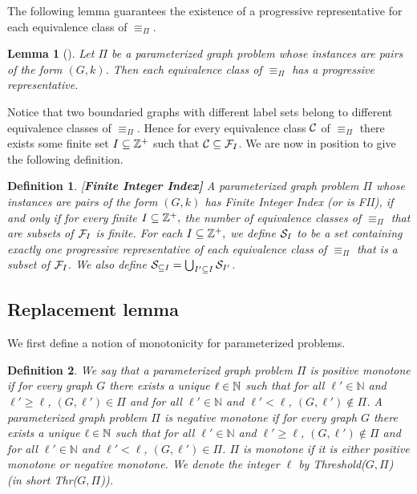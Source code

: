 \documentclass[11pt]{article}
\newtheorem{lemma}{Lemma}
\newtheorem{definition}{Definition}
\newcommand{\mar}[1]{#1}
\newcommand{\term}[1]{#1}
\begin{document}
The following lemma guarantees the existence of a progressive representative for each equivalence class of 
$\equiv_{\Pi}$. 



\begin{lemma}[\cite{H.Bodlaender:2009ng}]
\label{lem:existprog}
Let $\Pi$ be a parameterized graph problem whose instances are pairs of the form $(G,k)$.
Then each  equivalence class of $\equiv_{\Pi}$ has a progressive representative.
\end{lemma}




Notice that two  boundaried graphs with different label sets belong to 
different equivalence classes of $\equiv_{\Pi}.$ Hence for every equivalence 
class ${\cal C}$ of $\equiv_{\Pi}$ there exists some finite set $I\subseteq\Bbb{Z}^{+}$ such that 
${\cal C}\subseteq  {\cal F}_{I}$. We are now in position  to give the following definition.

\begin{definition}{\rm [\bf Finite Integer Index]}
\label{def:deffii}
A parameterized graph problem $\Pi$ whose instances are pairs of the form $(G,k)$
has {\em Finite Integer Index} (or  is \term{{\em FII}}), if and only if for every finite $I\subseteq \Bbb{Z}^+,$
the number of equivalence classes of  $\equiv_{\Pi}$ that are subsets of ${\cal F}_{I}$
is finite. For each $I\subseteq \Bbb{Z}^{+},$ we define $\mar{{\cal S}_I}$ to be
a set containing exactly one progressive representative of each equivalence class of $\equiv_{\Pi}$
that is a subset of ${\cal F}_{ I}$. We also define $\mar{{\cal S}_{\subseteq I}}=\bigcup_{I'\subseteq I} \mar{{\cal S}_{I'}} $. 
\end{definition} 


\subsection{Replacement lemma}




We first define a notion of monotonicity for parameterized problems. 

\begin{definition}
We say that a parameterized graph problem $\Pi$ is {\em positive monotone} if for every graph $G$ 
there exists a unique $\ell \in \Bbb{N}$ such that for all $\ell'\in \mathbb{N}$ and $\ell' \geq \ell$, $(G,\ell')\in \Pi$ and for all 
$\ell'\in \mathbb{N}$ and $\ell' < \ell$, $(G,\ell')\notin \Pi$.  A parameterized graph problem $\Pi$ is {\em negative monotone} if for every graph $G$ 
there exists a unique $\ell \in \Bbb{N}$ such that for all $\ell'\in \mathbb{N}$ and $\ell' \geq \ell$, $(G,\ell')\notin \Pi$ and for all 
$\ell'\in \mathbb{N}$ and $\ell' < \ell$, $(G,\ell')\in \Pi$. $\Pi$ is monotone if it is either positive monotone or negative monotone.  
We denote the integer $\ell$ by {\sc Threshold($G,\Pi$)} (in short  {\sc Thr($G,\Pi$)}). 
\end{definition}
\end{document}
